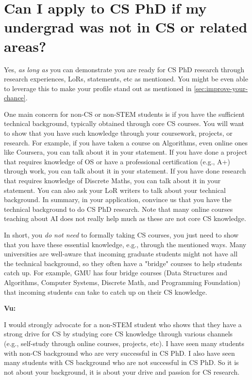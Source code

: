 \documentclass[oneside,11pt]{memoir}
\newenvironment{commentbox}[1][]{
  \small
  \begin{mybox}
    {\small \textbf{#1}}
  }{
  \end{mybox}
}
\begin{document}


\section{Can I apply to CS PhD if my undergrad was not in CS or related areas?}\label{sec:non-stem}

Yes, \emph{as long as} you can demonstrate you are ready for CS PhD research through research experiences, LoRs, statements, etc as mentioned. You might be even able to leverage this to make your profile stand out as mentioned in \autoref{sec:improve-your-chance}.

One main concern for non-CS or non-STEM students is if you have the sufficient technical background, typically obtained through core CS courses.  You will want to show that you have such knowledge through your coursework, projects, or research.
For example, if you have taken a course on Algorithms, even online ones like Coursera, you can talk about it in your statement.  If you have done a project that requires knowledge of OS or have a professional certification (e.g., A+) through work, you can talk about it in your statement.  If you have done research that requires knowledge of Discrete Maths, you can talk about it in your statement.  You can also ask your LoR writers to talk about your technical background.  
In summary, in your application, convince us that you have the technical background to do CS PhD research. 
Note that many online courses teaching about AI does not really help much as these are not core CS knowledge.

In short, you \emph{do not need} to formally taking CS courses, you just need to show that you have these essential knowledge, e.g., through the mentioned ways. Many universities are well-aware that incoming graduate students might not have all the technical background, so they often have a "bridge" courses to help students catch up.  For example, GMU has four bridge courses (Data Structures and Algorithms, Computer Systems, Discrete Math, and Programming Foundation) that incoming students can take to catch up on their CS knowledge.

\begin{commentbox}[Vu:]
  I would strongly advocate for a non-STEM student who shows that they have a strong drive for CS by studying core CS knowledge through various channels (e.g., self-study through online courses, projects, etc).  I have seen many students with non-CS background who are very successful in CS PhD.  I also have seen many students with CS background who are not successful in CS PhD.  So it is not about your background, it is about your drive and passion for CS research.
\end{commentbox}
\end{document}
